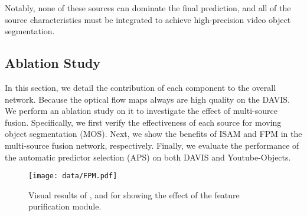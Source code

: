 \documentclass[sigconf]{acmart}
\begin{document}
 Notably, none of these sources can dominate the final prediction, and all of the source characteristics must be integrated to achieve high-precision video object segmentation.
\begin{table}
	\centering
	  \setlength{\abovecaptionskip}{3pt}
	\caption{Ablation study on the validation set of DAVIS.}
	\label{tab:Table4}
	\vspace{-8mm}
\end{table}
\subsection{Ablation Study}\label{sec:AbStd}
In this section, we detail the contribution of each component to the overall network. Because the optical flow maps always are high quality on the DAVIS. 
We perform an ablation study on it to investigate the effect of multi-source fusion.
Specifically, we first verify the effectiveness of each source for moving object segmentation (MOS). Next, we show the benefits of ISAM and FPM in the multi-source fusion network, respectively. Finally, we evaluate the performance of the automatic predictor selection (APS) on both DAVIS and Youtube-Objects. 
\begin{figure}[t]
\texttt{[image: data/FPM.pdf]}\\
        \centering
\caption{Visual results  of  ,  and  for  showing  the  effect of the feature purification module.}
\label{fig:visual_fpm}
\vspace{-5mm}
\end{figure} 
\end{document}
